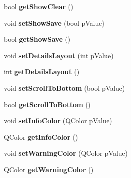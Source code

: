 \begin{DoxyCompactItemize}
\item 
\hypertarget{classQELog_a134039567e973301ef469e3effc1a168}{
bool {\bfseries getShowClear} ()}
\label{classQELog_a134039567e973301ef469e3effc1a168}

\item 
\hypertarget{classQELog_a6d284ca7fee43fcdfcf8c0f7e780fad6}{
void {\bfseries setShowSave} (bool pValue)}
\label{classQELog_a6d284ca7fee43fcdfcf8c0f7e780fad6}

\item 
\hypertarget{classQELog_a2e7a396cd52d23d2ad4b5ba6238aec2b}{
bool {\bfseries getShowSave} ()}
\label{classQELog_a2e7a396cd52d23d2ad4b5ba6238aec2b}

\item 
\hypertarget{classQELog_a5c762bcd55b11bf4ffe0294e10a59e33}{
void {\bfseries setDetailsLayout} (int pValue)}
\label{classQELog_a5c762bcd55b11bf4ffe0294e10a59e33}

\item 
\hypertarget{classQELog_ac7beaaef82e263744eae47f5f1cde4ae}{
int {\bfseries getDetailsLayout} ()}
\label{classQELog_ac7beaaef82e263744eae47f5f1cde4ae}

\item 
\hypertarget{classQELog_a98ca811e5b75f0be827b80f307537f5e}{
void {\bfseries setScrollToBottom} (bool pValue)}
\label{classQELog_a98ca811e5b75f0be827b80f307537f5e}

\item 
\hypertarget{classQELog_a1e9d96a97129270f5eddd82c760aa965}{
bool {\bfseries getScrollToBottom} ()}
\label{classQELog_a1e9d96a97129270f5eddd82c760aa965}

\item 
\hypertarget{classQELog_a6771e6806cb1152d55d7314814666e2c}{
void {\bfseries setInfoColor} (QColor pValue)}
\label{classQELog_a6771e6806cb1152d55d7314814666e2c}

\item 
\hypertarget{classQELog_a65c4ca881ac4c0c36e5aa92c147516e6}{
QColor {\bfseries getInfoColor} ()}
\label{classQELog_a65c4ca881ac4c0c36e5aa92c147516e6}

\item 
\hypertarget{classQELog_ab064d5949b9f386af8a2777121734a41}{
void {\bfseries setWarningColor} (QColor pValue)}
\label{classQELog_ab064d5949b9f386af8a2777121734a41}

\item 
\hypertarget{classQELog_a71790e5ac0d3070b3006313fb361b90a}{
QColor {\bfseries getWarningColor} ()}
\label{classQELog_a71790e5ac0d3070b3006313fb361b90a}


\end{DoxyCompactItemize}

